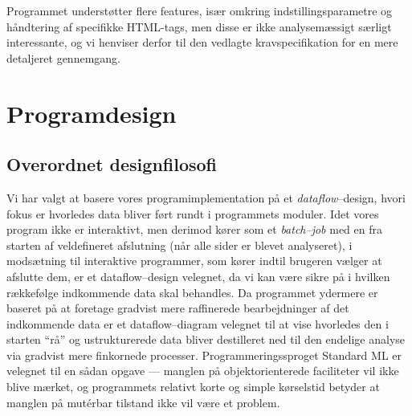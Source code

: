 \documentclass[a4paper,oneside,article]{memoir}
\begin{document}
Programmet understøtter flere features, især omkring
indstillingsparametre og håndtering af specifikke HTML-tags, men disse
er ikke analysemæssigt særligt interessante, og vi henviser derfor til
den vedlagte kravspecifikation for en mere detaljeret gennemgang.

\chapter{Programdesign}

\section{Overordnet designfilosofi}
Vi har valgt at basere vores programimplementation på et
\textit{dataflow}--design, hvori fokus er hvorledes data bliver ført
rundt i programmets moduler. Idet vores program ikke er interaktivt,
men derimod kører som et \textit{batch--job} med en fra starten af
veldefineret afslutning (når alle sider er blevet analyseret), i
modsætning til interaktive programmer, som kører indtil brugeren
vælger at afslutte dem, er et dataflow--design velegnet, da vi kan
være sikre på i hvilken rækkefølge indkommende data skal behandles. Da
programmet ydermere er baseret på at foretage gradvist mere
raffinerede bearbejdninger af det indkommende data er et
dataflow--diagram velegnet til at vise hvorledes den i starten ``rå''
og ustrukturerede data bliver destilleret ned til den endelige analyse
via gradvist mere finkornede processer. Programmeringssproget Standard
ML er velegnet til en sådan opgave --- manglen på objektorienterede
faciliteter vil ikke blive mærket, og programmets relativt korte og
simple kørselstid betyder at manglen på mutérbar tilstand ikke vil
være et problem. 
\end{document}
